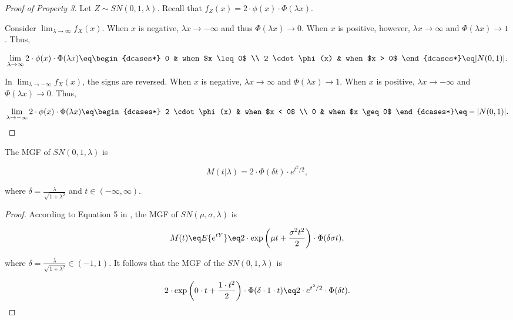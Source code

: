 \begin{proof}[Proof of Property 3]
  Let $Z \sim SN(0,1,\lambda)$. Recall that $f_Z(x) = 2 \cdot \phi(x) \cdot
  \Phi(\lambda x)$.

  Consider $\lim_{\lambda \to \infty} f_X(x)$. When $x$ is negative, $\lambda x
  \to -\infty$ and thus $\Phi(\lambda x) \to 0$. When $x$ is positive, however,
  $\lambda x \to \infty$ and $\Phi(\lambda x) \to 1$. Thus,

  \begin{equation}
    \label{eq:p2-positive-half-normal}
    \lim_{\lambda \to \infty} 2 \cdot \phi(x) \cdot \Phi(\lambda x) \eq
    \begin{dcases*}
      0 & when $x \leq 0$ \\
      2 \cdot \phi(x) & when $x > 0$
    \end{dcases*}
    \eq |N(0,1)|.
  \end{equation}

  In $\lim_{\lambda \to -\infty} f_X(x)$, the signs are reversed. When $x$ is
  negative, $\lambda x \to \infty$ and $\Phi(\lambda x) \to 1$. When $x$ is
  positive, $\lambda x \to -\infty$ and $\Phi(\lambda x) \to 0$. Thus,

  \begin{equation}
    \label{eq:p2-negative-half-normal}
    \lim_{\lambda \to -\infty} 2 \cdot \phi(x) \cdot \Phi(\lambda x) \eq
    \begin{dcases*}
      2 \cdot \phi(x) & when $x < 0$ \\
      0 & when $x \geq 0$
    \end{dcases*}
    \eq -|N(0,1)|.
  \end{equation}
\end{proof}


\begin{property} \label{prop:4}
  The MGF of $SN(0,1,\lambda)$ is

  \begin{equation} \label{eq:p4-sn-mgf}
    M(t|\lambda) = 2 \cdot \Phi (\delta t) \cdot e^{t^2/2},
  \end{equation}
    
  where $\delta = \frac{\lambda}{\sqrt{1 + \lambda^2}}$ and $t \in (-\infty, \infty)$.
\end{property}

\begin{proof}
  According to Equation 5 in \citet{azzalini}, the MGF of $SN(\mu, \sigma,
  \lambda)$ is

  \begin{equation*}
    M(t) \eq E\{e^{tY}\} \eq 2 \cdot \exp \left( \mu t + \frac{\sigma^2 t^2}{2} \right) \cdot \Phi(\delta \sigma t),
  \end{equation*}

  where $\delta = \frac{\lambda}{\sqrt{1 + \lambda^2}} \in (-1, 1)$. It follows
  that the MGF of the $SN(0, 1, \lambda)$ is

  \begin{equation*}
    2 \cdot \exp \left( 0 \cdot t + \frac{1 \cdot t^2}{2} \right) \cdot \Phi(\delta \cdot 1 \cdot t) \eq 2 \cdot e^{t^2/2} \cdot \Phi(\delta t).
  \end{equation*}
\end{proof}
